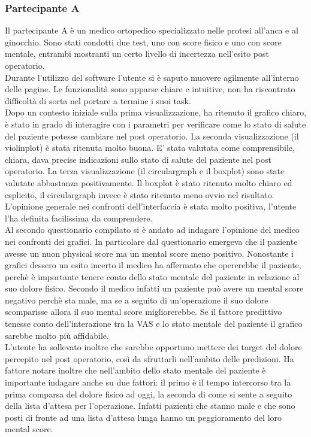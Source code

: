 \subsubsection{Partecipante A}
Il partecipante A è un medico ortopedico specializzato nelle protesi all'anca e al ginocchio.
Sono stati condotti due test, uno con score fisico e uno con score mentale, entrambi mostranti un certo livello di incertezza nell'esito post operatorio. \\
Durante l'utilizzo del software l'utente si è saputo muovere agilmente all'interno delle pagine. Le funzionalità sono apparse chiare e intuitive, non ha riscontrato difficoltà di sorta nel portare a termine i suoi task. \\
Dopo un contesto iniziale sulla prima visualizzazione, ha ritenuto il grafico chiaro, è stato in grado di interagire con i parametri per verificare come lo stato di salute del paziente potesse cambiare nel post operatorio. La seconda visualizzazione (il violinplot) è stata ritenuta molto buona. E' stata valutata come comprensibile, chiara, dava precise indicazioni sullo stato di salute del paziente nel post operatorio. La terza visualizzazione (il circulargraph e il boxplot) sono state valutate abbastanza positivamente. Il boxplot è stato ritenuto molto chiaro ed esplicito, il circulargraph invece è stato ritenuto meno ovvio nel risultato. \\ 
L'opinione generale nei confronti dell'interfaccia è stata molto positiva, l'utente l'ha definita facilissima da comprendere. \\
Al secondo questionario compilato si è andato ad indagare l'opinione del medico nei confronti dei grafici. In particolare dal questionario emergeva che il paziente avesse un nuon physical score ma un mental score meno positivo. Nonostante i grafici dessero un esito incerto il medico ha affermato che opererebbe il paziente, perchè è importante tenere conto dello stato mentale del paziente in relazione al suo dolore fisico. Secondo il medico infatti un paziente può avere un mental score negativo perchè sta male, ma se a seguito di un'operazione il suo dolore scomparisse allora il suo mental score migliorerebbe. Se il fattore predittivo tenesse conto dell'interazione tra la VAS e lo stato mentale del paziente il grafico sarebbe molto più affidabile.\\
L'utente ha sollevato inoltre che sarebbe opportuno mettere dei target del dolore percepito nel post operatorio, così da sfruttarli nell'ambito delle predizioni. Ha fattore notare inoltre che nell'ambito dello stato mentale del paziente è importante indagare anche su due fattori: il primo è il tempo intercorso tra la prima comparsa del dolore fisico ad oggi, la seconda di come si sente a seguito della lista d'attesa per l'operazione. Infatti pazienti che stanno male e che sono posti di fronte ad una lista d'attesa lunga hanno un peggioramento del loro mental score. \\
